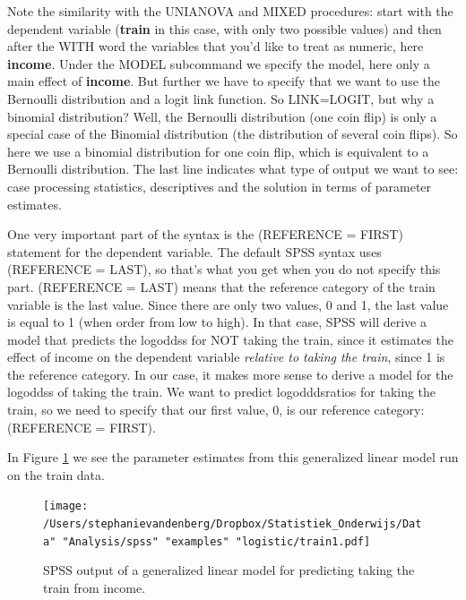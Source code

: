 \documentclass[]{book}\usepackage[]{graphicx}\usepackage[]{color}
\begin{document}
Note the similarity with the UNIANOVA and MIXED procedures: start with the dependent variable (\textbf{train} in this case, with only two possible values) and then after the WITH word the variables that you'd like to treat as numeric, here \textbf{income}. Under the MODEL subcommand we specify the model, here only a main effect of \textbf{income}. But further we have to specify that we want to use the Bernoulli distribution and a logit link function. So LINK=LOGIT, but why a binomial distribution? Well, the Bernoulli distribution (one coin flip) is only a special case of the Binomial distribution (the distribution of several coin flips). So here we use a binomial distribution for one coin flip, which is equivalent to a Bernoulli distribution. The last line indicates what type of output we want to see: case processing statistics, descriptives and the solution in terms of parameter estimates.

One very important part of the syntax is the (REFERENCE = FIRST) statement for the dependent variable. The default SPSS syntax uses (REFERENCE = LAST), so that's what you get when you do not specify this part. (REFERENCE = LAST) means that the reference category of the train variable is the last value. Since there are only two values, 0 and 1, the last value is equal to 1 (when order from low to high). In that case, SPSS will derive a model that predicts the logoddss for NOT taking the train, since it estimates the effect of income on the dependent variable \textit{relative to taking the train}, since 1 is the reference category. In our case, it makes more sense to derive a model for the logoddss of taking the train. We want to predict logodddsratios for taking the train, so we need to specify that our first value, 0, is our reference category: (REFERENCE = FIRST).


In Figure \ref{fig:train1} we see the parameter estimates from this generalized linear model run on the train data.


\begin{figure}[h]
    \begin{center}
       \texttt{[image: /Users/stephanievandenberg/Dropbox/Statistiek\_Onderwijs/Data" "Analysis/spss" "examples" "logistic/train1.pdf]}
    \end{center}
     \caption{SPSS output of a generalized linear model for predicting taking the train from income.}
    \label{fig:train1}
\end{figure}
\end{document}
